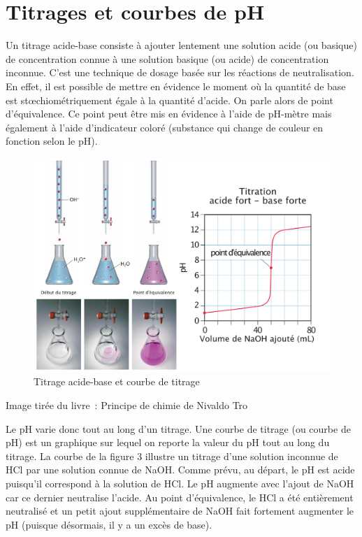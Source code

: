 \documentclass[
  11pt,
  a4paper,
  openany]{book}
\newenvironment{credit}
  {\vspace{-2em}\begin{center}\begin{footnotesize}\begin{textit}}
  {\end{textit}\end{footnotesize}\end{center}}
\begin{document}
\clearpage

\hypertarget{titrages-et-courbes-de-ph}{%
\section{Titrages et courbes de pH}\label{titrages-et-courbes-de-ph}}

Un titrage acide-base consiste à ajouter lentement une solution acide (ou basique) de concentration connue à une solution basique (ou acide) de concentration inconnue. C'est une technique de dosage basée sur les réactions de neutralisation. En effet, il est possible de mettre en évidence le moment où la quantité de base est stœchiométriquement égale à la quantité d'acide. On parle alors de point d'équivalence. Ce point peut être mis en évidence à l'aide de pH-mètre mais également à l'aide d'indicateur coloré (substance qui change de couleur en fonction selon le pH).

\begin{figure}

{\centering \includegraphics[width=1\linewidth]{images/acides-bases-5} 

}

\caption{Titrage acide-base et courbe de titrage}\label{fig:acides-bases-5}
\end{figure}

\begin{credit}
Image tirée du livre~: Principe de chimie de Nivaldo Tro

\end{credit}

Le pH varie donc tout au long d'un titrage. Une courbe de titrage (ou courbe de pH) est un graphique sur lequel on reporte la valeur du pH tout au long du titrage. La courbe de la figure 3 illustre un titrage d'une solution inconnue de HCl par une solution connue de NaOH. Comme prévu, au départ, le pH est acide puisqu'il correspond à la solution de HCl. Le pH augmente avec l'ajout de NaOH car ce dernier neutralise l'acide. Au point d'équivalence, le HCl a été entièrement neutralisé et un petit ajout supplémentaire de NaOH fait fortement augmenter le pH (puisque désormais, il y a un excès de base).
\end{document}
